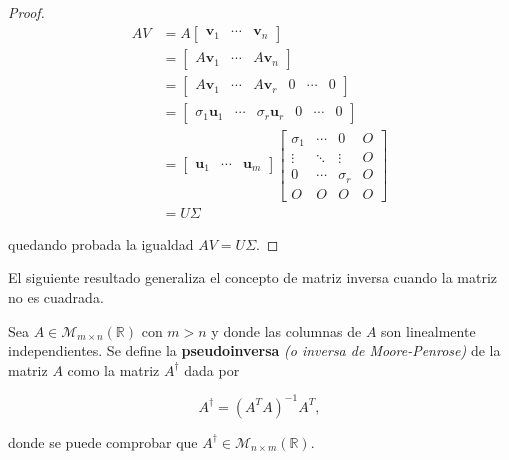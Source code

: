 \begin{proof}
    \begin{align*}
        A V &= A \begin{bmatrix} \mathbf{v}_1 & \cdots & \mathbf{v}_n \end{bmatrix} \\
            &= \begin{bmatrix} A \mathbf{v}_1 & \cdots & A \mathbf{v}_n \end{bmatrix} \\
            &= \begin{bmatrix} A \mathbf{v}_1 & \cdots & A \mathbf{v}_r & 0 & \cdots & 0 \end{bmatrix} \\
            &= \begin{bmatrix} \sigma_1 \mathbf{u}_1 & \cdots & \sigma_r \mathbf{u}_r & 0 & \cdots & 0 \end{bmatrix} \\
            &= \begin{bmatrix} \mathbf{u}_1 & \cdots & \mathbf{u}_m \end{bmatrix}
               \begin{bmatrix} 
                   \sigma_1 & \cdots & 0 & O \\
                   \vdots & \ddots & \vdots & O \\
                   0 & \cdots & \sigma_r & O \\
                   O & O & O & O
               \end{bmatrix} \\
            &= U \Sigma
    \end{align*}

    quedando probada la igualdad $AV = U \Sigma$.
\end{proof}

El siguiente resultado generaliza el concepto de matriz inversa cuando la matriz no es cuadrada.
\begin{definicion}[Pseudoinversa]
    Sea $A \in \mathcal{M}_{m \times n}(\mathbb{R})$ con $m > n$ y donde las columnas de $A$ son linealmente independientes. Se define la \textbf{pseudoinversa} \emph{(o inversa de Moore-Penrose)} de la matriz $A$ como la matriz $A^{\dagger}$ dada por

    \[ A^{\dagger} = {(A^{T}A)}^{-1}A^{T}, \]

    donde se puede comprobar que $A^{\dagger} \in \mathcal{M}_{n \times m}(\mathbb{R})$.
\end{definicion}

